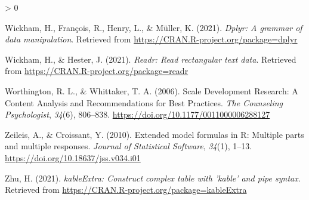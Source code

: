 \documentclass[
  english,
  man]{apa6}
\newlength{\cslhangindent}
\newenvironment{CSLReferences}[2] %
 {%
  \setlength{\parindent}{0pt}
  \ifodd #1 \everypar{\setlength{\hangindent}{\cslhangindent}}\ignorespaces\fi
  \ifnum #2 > 0
  \setlength{\parskip}{#2\baselineskip}
  \fi
 }%
 {}
\begin{document}
\begin{CSLReferences}{1}{0}
\leavevmode\hypertarget{ref-R-dplyr}{}%
Wickham, H., François, R., Henry, L., \& Müller, K. (2021). \emph{Dplyr: A grammar of data manipulation}. Retrieved from \url{https://CRAN.R-project.org/package=dplyr}

\leavevmode\hypertarget{ref-R-readr}{}%
Wickham, H., \& Hester, J. (2021). \emph{Readr: Read rectangular text data}. Retrieved from \url{https://CRAN.R-project.org/package=readr}

\leavevmode\hypertarget{ref-worthingtonScaleDevelopmentResearch2006}{}%
Worthington, R. L., \& Whittaker, T. A. (2006). Scale {Development Research}: {A Content Analysis} and {Recommendations} for {Best Practices}. \emph{The Counseling Psychologist}, \emph{34}(6), 806--838. \url{https://doi.org/10.1177/0011000006288127}

\leavevmode\hypertarget{ref-R-Formula}{}%
Zeileis, A., \& Croissant, Y. (2010). Extended model formulas in {R}: Multiple parts and multiple responses. \emph{Journal of Statistical Software}, \emph{34}(1), 1--13. \url{https://doi.org/10.18637/jss.v034.i01}

\leavevmode\hypertarget{ref-R-kableExtra}{}%
Zhu, H. (2021). \emph{kableExtra: Construct complex table with 'kable' and pipe syntax}. Retrieved from \url{https://CRAN.R-project.org/package=kableExtra}

\end{CSLReferences}

\endgroup
\end{document}
